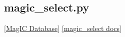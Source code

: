 \documentclass[11pt]{book}
\begin{document}
{{{{%
%
%
%
%
%
%
%
%
%


%

\subsection{magic\_select.py}
\href{#MagICDatabase}{[MagIC Database]}
\href{https://github.com/PmagPy/PmagPy/blob/master/programs/magic_select.py}{[magic\_select docs]}


}}}}
\end{document}
